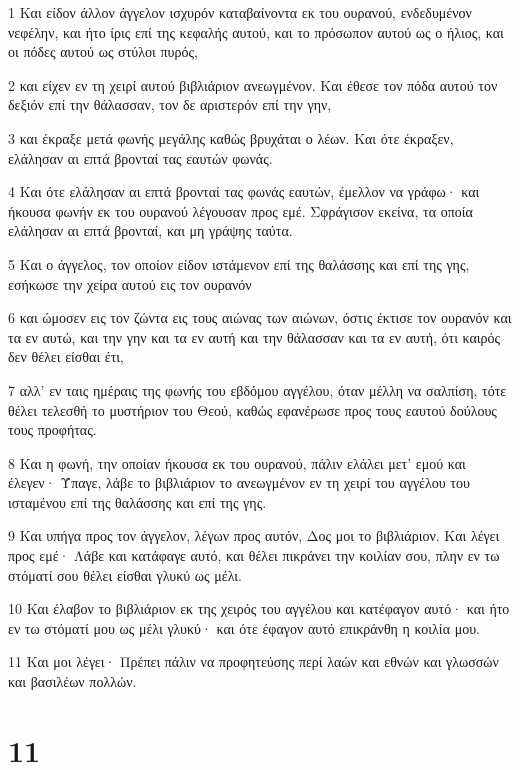 \par 1 Και είδον άλλον άγγελον ισχυρόν καταβαίνοντα εκ του ουρανού, ενδεδυμένον νεφέλην, και ήτο ίρις επί της κεφαλής αυτού, και το πρόσωπον αυτού ως ο ήλιος, και οι πόδες αυτού ως στύλοι πυρός,
\par 2 και είχεν εν τη χειρί αυτού βιβλιάριον ανεωγμένον. Και έθεσε τον πόδα αυτού τον δεξιόν επί την θάλασσαν, τον δε αριστερόν επί την γην,
\par 3 και έκραξε μετά φωνής μεγάλης καθώς βρυχάται ο λέων. Και ότε έκραξεν, ελάλησαν αι επτά βρονταί τας εαυτών φωνάς.
\par 4 Και ότε ελάλησαν αι επτά βρονταί τας φωνάς εαυτών, έμελλον να γράφω· και ήκουσα φωνήν εκ του ουρανού λέγουσαν προς εμέ. Σφράγισον εκείνα, τα οποία ελάλησαν αι επτά βρονταί, και μη γράψης ταύτα.
\par 5 Και ο άγγελος, τον οποίον είδον ιστάμενον επί της θαλάσσης και επί της γης, εσήκωσε την χείρα αυτού εις τον ουρανόν
\par 6 και ώμοσεν εις τον ζώντα εις τους αιώνας των αιώνων, όστις έκτισε τον ουρανόν και τα εν αυτώ, και την γην και τα εν αυτή και την θάλασσαν και τα εν αυτή, ότι καιρός δεν θέλει είσθαι έτι,
\par 7 αλλ' εν ταις ημέραις της φωνής του εβδόμου αγγέλου, όταν μέλλη να σαλπίση, τότε θέλει τελεσθή το μυστήριον του Θεού, καθώς εφανέρωσε προς τους εαυτού δούλους τους προφήτας.
\par 8 Και η φωνή, την οποίαν ήκουσα εκ του ουρανού, πάλιν ελάλει μετ' εμού και έλεγεν· Ύπαγε, λάβε το βιβλιάριον το ανεωγμένον εν τη χειρί του αγγέλου του ισταμένου επί της θαλάσσης και επί της γης.
\par 9 Και υπήγα προς τον άγγελον, λέγων προς αυτόν, Δος μοι το βιβλιάριον. Και λέγει προς εμέ· Λάβε και κατάφαγε αυτό, και θέλει πικράνει την κοιλίαν σου, πλην εν τω στόματί σου θέλει είσθαι γλυκύ ως μέλι.
\par 10 Και έλαβον το βιβλιάριον εκ της χειρός του αγγέλου και κατέφαγον αυτό· και ήτο εν τω στόματί μου ως μέλι γλυκύ· και ότε έφαγον αυτό επικράνθη η κοιλία μου.
\par 11 Και μοι λέγει· Πρέπει πάλιν να προφητεύσης περί λαών και εθνών και γλωσσών και βασιλέων πολλών.

\chapter{11}

